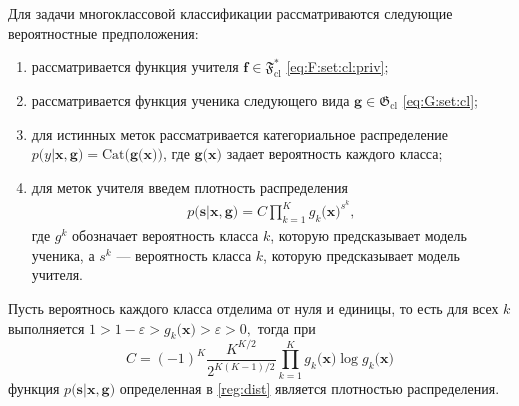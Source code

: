 Для задачи многоклассовой классификации рассматриваются следующие вероятностные предположения:
\begin{enumerate}
\label{st:class:1}
	\item рассматривается функция учителя $\mathbf{f}\in\mathfrak{F}_{\text{cl}}^{*}$ \eqref{eq:F:set:cl:priv};
	\item рассматривается функция ученика следующего вида $\mathbf{g}\in\mathfrak{G}_{\text{cl}}$ \eqref{eq:G:set:cl};
	\item для истинных меток рассматривается категориальное распределение $p\bigr(y|\mathbf{x}, \mathbf{g}\bigr) = \text{Cat}\bigr(\mathbf{g}\bigr(\mathbf{x}\bigr)\bigr)$, где $\mathbf{g}\bigr(\mathbf{x}\bigr)$ задает вероятность каждого класса;
	\item для меток учителя введем плотность распределения
\[
\label{reg:dist}
\begin{aligned}
	p\bigr(\mathbf{s}|\mathbf{x}, \mathbf{g}\bigr) = C\prod_{k=1}^{K}g_k\bigr(\mathbf{x}\bigr)^{s^k},
\end{aligned}
\]
где $g^k$ обозначает вероятность класса $k$, которую предсказывает модель ученика, а $s^k$ --- вероятность класса $k$, которую предсказывает модель учителя.
\end{enumerate}
\begin{theorem}
\label{theorem:st:dist}
Пусть вероятнось каждого класса отделима от нуля и единицы, то есть для всех $k$ выполняется $1 > 1- \varepsilon > g_k\bigr(\mathbf{x}\bigr) > \varepsilon > 0,$ тогда при
\[
C=\left(-1\right)^{K}\frac{K^{K/2}}{2^{K(K-1)/2}}\prod_{k=1}^{K}g_k\bigr(\mathbf{x}\bigr)\log g_k\bigr(\mathbf{x}\bigr)
\]
функция $p\bigr(\mathbf{s}|\mathbf{x}, \mathbf{g}\bigr)$ определенная в \eqref{reg:dist} является плотностью распределения.
\end{theorem}

